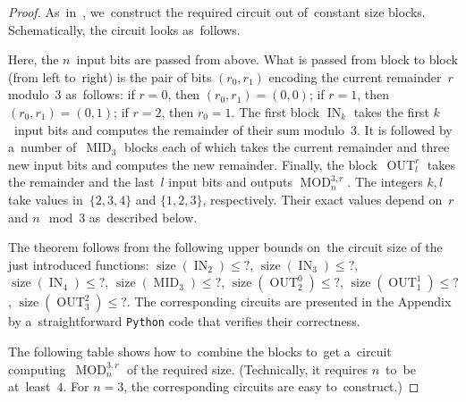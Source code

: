 \documentclass[12pt,letterpaper]{article}
\DeclareMathOperator{\MOD}{MOD}
\DeclareMathOperator{\size}{size}
\DeclareMathOperator{\IN}{IN}
\DeclareMathOperator{\MID}{MID}
\DeclareMathOperator{\OUT}{OUT}
\begin{document}
\begin{proof}
As~in~\cite{DBLP:conf/sat/KojevnikovKY09}, 
we~construct the required circuit out of~constant size blocks. Schematically, the circuit looks as~follows.

\begin{center}
\end{center}
%
Here, the $n$~input bits are passed from above.
What is passed from block to block (from left to~right)
is the pair of bits $(r_0, r_1)$ encoding the current remainder~$r$ modulo~$3$ as~follows: if $r=0$, then $(r_0,r_1)=(0,0)$; if $r=1$, then $(r_0,r_1)=(0,1)$; if $r=2$, then $r_0=1$. The first block $\IN_k$ takes the first $k$~input bits and computes the remainder of their sum modulo~$3$. It is followed by a~number of~$\MID_3$ blocks each of which takes the current remainder and three new input bits and computes the new remainder. Finally, the block~$\OUT_l^r$ takes the remainder and the last~$l$ input bits and outputs $\MOD_n^{3,r}$. The integers $k,l$ take values in~$\{2,3,4\}$ and $\{1,2,3\}$, respectively. Their exact values depend on~$r$ and $n \mod 3$ as~described below.

The theorem follows from the following upper bounds 
on~the circuit size of the just introduced functions:
$\size(\IN_2) \le ?$, 
$\size(\IN_3) \le ?$, 
$\size(\IN_4) \le ?$,
$\size(\MID_3) \le ?$,
$\size(\OUT_2^0) \le ?$,
$\size(\OUT_1^1) \le ?$,
$\size(\OUT_3^2) \le ?$.
The corresponding circuits are presented in the Appendix 
by a~straightforward \texttt{Python} code that verifies their correctness.

The following table shows how to~combine the blocks
to~get a~circuit computing~$\MOD_n^{3,r}$ of the required size. (Technically, it requires $n$~to~be at~least~$4$. For $n=3$, the corresponding circuits are easy to~construct.)


\end{proof}
\end{document}
